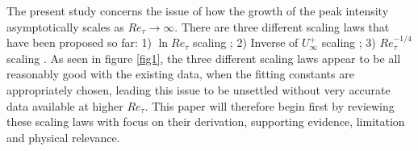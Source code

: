 \documentclass{jfm}
\begin{document}

The present study concerns the issue of how the growth of the peak intensity asymptotically scales as $Re_\tau \rightarrow \infty$. There are three different scaling laws that have been proposed so far: 1) $\ln Re_\tau$ scaling \cite[]{Marusic2003}; 2) Inverse of $U_{\infty}^+$ scaling \cite[$U_{\infty}$ is the freestream velocity in boundary layer and the superscript ${(\cdot)^+}$ denotes the inner-scaling with $u_\tau$ and $\nu$;][]{Monkewitz2015}; 3) $Re_\tau^{-1/4}$ scaling \cite[]{Chen2021}. As seen in figure \ref{fig1}, the three different scaling laws appear to be all reasonably good with the existing data, when the fitting constants are appropriately chosen, leading this issue to be unsettled without very accurate data available at higher $Re_\tau$. This paper will therefore begin first by reviewing these scaling laws with focus on their derivation, supporting evidence, limitation and physical relevance.
\end{document}
